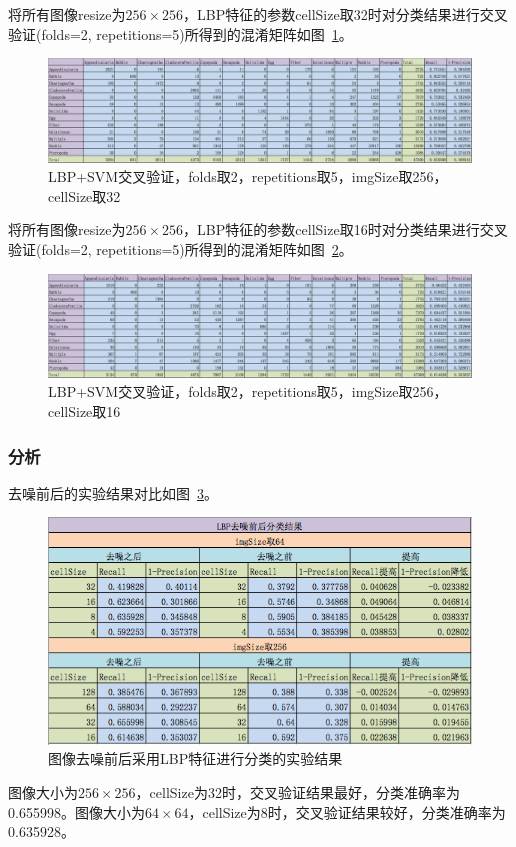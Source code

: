 \documentclass[12pt]{article}
\begin{document}
将所有图像resize为$256 \times 256$，LBP特征的参数cellSize取32时对分类结果进行交叉验证(folds=2, repetitions=5)所得到的混淆矩阵如图~\ref{fig:LBP-SVM-2-folds-5-repetitions-32-256-noNoise}。
\begin{figure}[!ht]
\centering
\includegraphics[width=1.0\linewidth]{LBP-SVM-2-folds-5-repetitions-32-256-noNoise}
\caption{LBP+SVM交叉验证，folds取2，repetitions取5，imgSize取256，cellSize取32}
\label{fig:LBP-SVM-2-folds-5-repetitions-32-256-noNoise}
\end{figure}

将所有图像resize为$256 \times 256$，LBP特征的参数cellSize取16时对分类结果进行交叉验证(folds=2, repetitions=5)所得到的混淆矩阵如图~\ref{fig:LBP-SVM-2-folds-5-repetitions-16-256-noNoise}。
\begin{figure}[!ht]
\centering
\includegraphics[width=1.0\linewidth]{LBP-SVM-2-folds-5-repetitions-16-256-noNoise}
\caption{LBP+SVM交叉验证，folds取2，repetitions取5，imgSize取256，cellSize取16}
\label{fig:LBP-SVM-2-folds-5-repetitions-16-256-noNoise}
\end{figure}

\subsubsection{分析}
去噪前后的实验结果对比如图~\ref{fig:LBP-compare}。
\begin{figure}[!ht]
\centering
\includegraphics[width=0.45\linewidth]{LBP-compare}
\caption{图像去噪前后采用LBP特征进行分类的实验结果}
\label{fig:LBP-compare}
\end{figure}
图像大小为$256 \times 256$，cellSize为32时，交叉验证结果最好，分类准确率为0.655998。图像大小为$64 \times 64$，cellSize为8时，交叉验证结果较好，分类准确率为0.635928。
\end{document}
